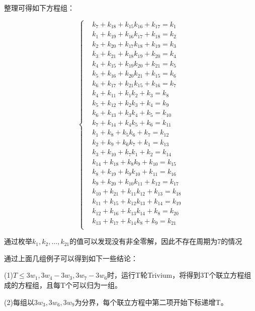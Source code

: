 整理可得如下方程组：

\begin{equation}
\left\{
\begin{aligned}
&k_{7}+k_{18}+k_{15}k_{16}+k_{17}=k_{1}\\
&k_{1}+k_{19}+k_{16}k_{17}+k_{18}=k_{2}\\
&k_{2}+k_{20}+k_{17}k_{18}+k_{19}=k_{3}\\
&k_{3}+k_{21}+k_{18}k_{19}+k_{20}=k_{4}\\
&k_{4}+k_{15}+k_{19}k_{20}+k_{21}=k_{5}\\
&k_{5}+k_{16}+k_{20}k_{21}+k_{15}=k_{6}\\
&k_{6}+k_{17}+k_{21}k_{15}+k_{16}=k_{7}\\
&k_{4}+k_{11}+k_{1}k_{2}+k_{3}=k_{8}\\
&k_{5}+k_{12}+k_{2}k_{3}+k_{4}=k_{9}\\
&k_{6}+k_{13}+k_{3}k_{4}+k_{5}=k_{10}\\
&k_{7}+k_{14}+k_{4}k_{5}+k_{6}=k_{11}\\
&k_{1}+k_{8}+k_{5}k_{6}+k_{7}=k_{12}\\
&k_{2}+k_{9}+k_{6}k_{7}+k_{1}=k_{13}\\
&k_{3}+k_{10}+k_{7}k_{1}+k_{2}=k_{14}\\
&k_{14}+k_{18}+k_{8}k_{9}+k_{10}=k_{15}\\
&k_{8}+k_{19}+k_{9}k_{10}+k_{11}=k_{16}\\
&k_{9}+k_{20}+k_{10}k_{11}+k_{12}=k_{17}\\
&k_{10}+k_{21}+k_{11}k_{12}+k_{13}=k_{18}\\
&k_{11}+k_{15}+k_{12}k_{13}+k_{14}=k_{19}\\
&k_{12}+k_{16}+k_{13}k_{14}+k_{8}=k_{20}\\
&k_{13}+k_{17}+k_{14}k_{8}+k_{9}=k_{21}\\
\end{aligned}
\right.
\end{equation}

通过枚举$k_{1}, k_{2}, \ldots, k_{21}$的值可以发现没有非全零解，因此不存在周期为7的情况

\vspace{3ex}

通过上面几组例子可以得到如下一些结论：

(1)$T \leq 3w_{1},3w_{4}-3w_{3},3w_{7}-3w_{6}$时，运行T轮Trivium，将得到3T个联立方程组成的方程组，且每T个可以归为一组。

(2)每组以$3w_{3},3w_{6},3w_{9}$为分界，每个联立方程中第二项开始下标递增T。

